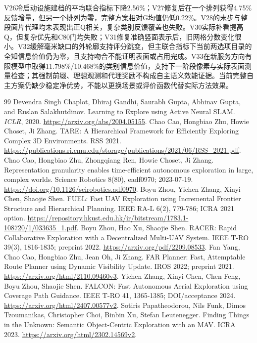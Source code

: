\documentclass[11pt,a4paper]{article}
\begin{document}
V26冷启动设施建档的平均联合指标下降2.56\%；V27修复后在一个排列获得4.75\%反馈增量，但另一个排列为零，完整方案相对G均值仍低0.22\%。V28的末步与整段面片代理均未表现出正Q相关，复杂类别反馈覆盖也失败。V30实际补看提高Q，但复杂优先和C80门均失败；V31修复准确竖面表示后，旧网格分数变化很小。V32缓解毫米缺口的外轮廓支持评分跳变，但主联合指标下当前两选项目录的全知信息价值仍为零，且支持吻合不能证明表面或占用完成。V33在新服务方向有限模型中取得11.798\%/10.468\%的类别信息价值，支持下一阶段像素与实际表面测量检查；其强制前缀、理想观测和代理奖励不构成自主语义效能证据。当前完整自主方案仍缺少稳定净优势，不能以更换场景或评价函数代替实际方法效果。

\begin{thebibliography}{99}
 Devendra Singh Chaplot, Dhiraj Gandhi, Saurabh Gupta, Abhinav Gupta, and Ruslan Salakhutdinov. Learning to Explore using Active Neural SLAM. \emph{ICLR}, 2020. \url{https://arxiv.org/abs/2004.05155}.
 Chao Cao, Hongbiao Zhu, Howie Choset, Ji Zhang. TARE: A Hierarchical Framework for Efficiently Exploring Complex 3D Environments. RSS 2021. \url{https://publications.ri.cmu.edu/storage/publications/2021/06/RSS_2021.pdf}.
 Chao Cao, Hongbiao Zhu, Zhongqiang Ren, Howie Choset, Ji Zhang. Representation granularity enables time-efficient autonomous exploration in large, complex worlds. Science Robotics 8(80), eadf0970; 2023-07-19. \url{https://doi.org/10.1126/scirobotics.adf0970}.
 Boyu Zhou, Yichen Zhang, Xinyi Chen, Shaojie Shen. FUEL: Fast UAV Exploration using Incremental Frontier Structure and Hierarchical Planning. IEEE RA-L 6(2), 779-786; ICRA 2021 option. \url{https://repository.hkust.edu.hk/ir/bitstream/1783.1-108720/1/033635_1.pdf}.
 Boyu Zhou, Hao Xu, Shaojie Shen. RACER: Rapid Collaborative Exploration with a Decentralized Multi-UAV System. IEEE T-RO 39(3), 1816-1835; preprint 2022. \url{https://arxiv.org/pdf/2209.08533}.
 Fan Yang, Chao Cao, Hongbiao Zhu, Jean Oh, Ji Zhang. FAR Planner: Fast, Attemptable Route Planner using Dynamic Visibility Update. IROS 2022; preprint 2021. \url{https://arxiv.org/html/2110.09460v3}.
 Yichen Zhang, Xinyi Chen, Chen Feng, Boyu Zhou, Shaojie Shen. FALCON: Fast Autonomous Aerial Exploration using Coverage Path Guidance. IEEE T-RO 41, 1365-1385; DOI/acceptance 2024. \url{https://arxiv.org/html/2407.00577v2}.
 Sotiris Papatheodorou, Nils Funk, Dimos Tzoumanikas, Christopher Choi, Binbin Xu, Stefan Leutenegger. Finding Things in the Unknown: Semantic Object-Centric Exploration with an MAV. ICRA 2023. \url{https://arxiv.org/html/2302.14569v2}.

\end{thebibliography}
\end{document}

